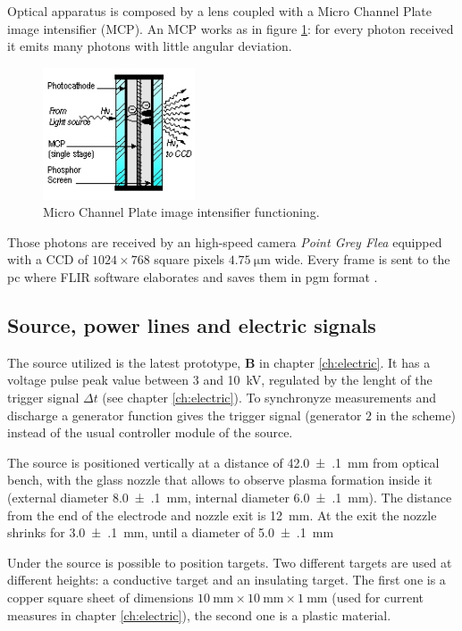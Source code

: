Optical apparatus is composed by a lens %
 coupled with a Micro Channel Plate image intensifier (MCP). An MCP works as in figure \ref{fig:MCP}: for every photon received it emits many photons with little angular deviation.
\begin{figure}
 \centering
 \includegraphics[width=0.4\textwidth]{Images/Shape/MCPsingle-stage.jpg}
 \caption{Micro Channel Plate image intensifier functioning.}
 \label{fig:MCP}
\end{figure}

Those photons are received by an high-speed camera \emph{Point Grey Flea} \cite{flea} equipped with a CCD of $\num{1024} \times \num{768}$ square pixels $\SI{4.75}{\micro\meter}$ wide. Every frame is sent to the pc where FLIR software elaborates and saves them in pgm format \cite{pgm}.


\subsection{Source, power lines and electric signals}
The source utilized is the latest prototype, \textbf{B} in chapter \ref{ch:electric}. It has a voltage pulse peak value between $\num{3}$ and \SI{10}{\kilo\volt}, regulated by the lenght of the trigger signal $\Delta t$ (see chapter \ref{ch:electric}). To synchronyze measurements and discharge a generator function gives the trigger signal (generator $2$ in the scheme) instead of the usual controller module of the source.

The source is positioned vertically at a distance of \SI{42.0(1)}{\milli\meter} from optical bench, with the glass nozzle that allows to observe plasma formation inside it (external diameter \SI{8.0(1)}{\milli\meter}, internal diameter \SI{6.0(1)}{\milli\meter}). The distance from the end of the electrode and nozzle exit is \SI{12}{\milli\meter}. At the exit the nozzle shrinks for \SI{3.0(1)}{\milli\meter}, until a diameter of \SI{5.0(1)}{\milli\meter}

Under the source is possible to position targets. Two different targets are used at different heights: a conductive target and an insulating target. The first one is a copper square sheet of dimensions $\SI{10}{\milli\meter} \times \SI{10}{\milli\meter} \times \SI{1}{\milli\meter}$ (used for current measures in chapter \ref{ch:electric}), the second one is a plastic material.

